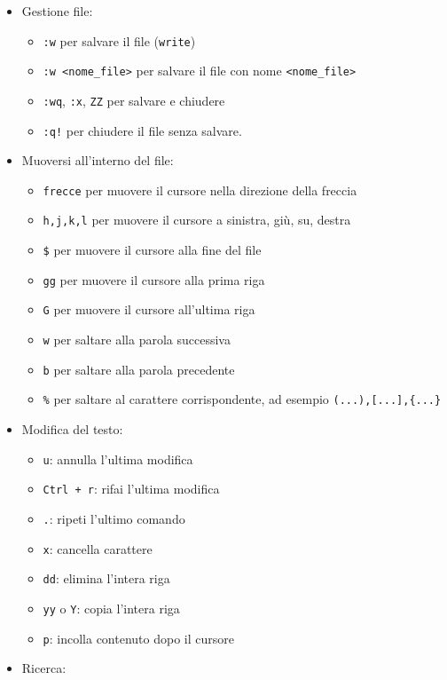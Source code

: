 \documentclass[11pt]{book}
\begin{document}
 \begin{itemize}
 	\item Gestione file:
 		\begin{itemize}
 			\item \verb*|:w| per salvare il file (\verb*|write|)
 			\item \verb*|:w <nome_file>| per salvare il file con nome \verb*|<nome_file>|
 			\item \verb*|:wq|, \verb*|:x|, \verb*|ZZ| per salvare e chiudere
 			\item \verb*|:q!| per chiudere il file senza salvare.
 		\end{itemize}
 	\item Muoversi all'interno del file:
 		\begin{itemize}
 			\item \verb*|frecce| per muovere il cursore nella direzione della freccia
 			\item \verb*|h,j,k,l| per muovere il cursore a sinistra, giù, su, destra
 			\item \verb*|$| per muovere il cursore alla fine del file
 			\item \verb*|gg| per muovere il cursore alla prima riga
 			\item \verb*|G| per muovere il cursore all'ultima riga
 			\item \verb*|w| per saltare alla parola successiva
 			\item \verb*|b| per saltare alla parola precedente
 			\item \verb*|%| per saltare al carattere corrispondente, ad esempio \verb*|(...),[...],{...}|
 		\end{itemize}
 	\item Modifica del testo:
 		\begin{itemize}
 			\item \verb*|u|: annulla l'ultima modifica
 			\item \verb*|Ctrl + r|: rifai l'ultima modifica
 			\item \verb*|.|: ripeti l'ultimo comando
 			\item \verb*|x|: cancella carattere
 			\item \verb*|dd|: elimina l'intera riga
 			\item \verb*|yy| o \verb*|Y|: copia l'intera riga
 			\item \verb*|p|: incolla contenuto dopo il cursore
 		\end{itemize}
 	\item Ricerca:
 		\begin{itemize}

\end{itemize}
\end{itemize}
\end{document}
